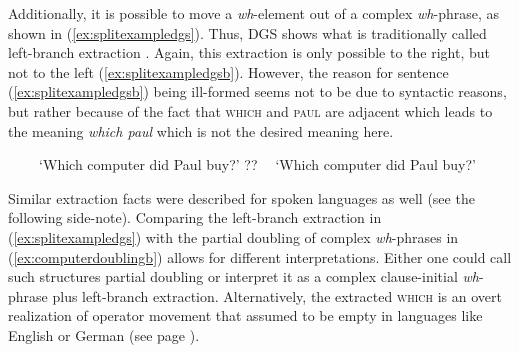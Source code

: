 \noindent Additionally, it is possible to move a \textit{wh}-element out of a complex \textit{wh}-phrase, as shown in (\ref{ex:splitexampledgs}). Thus, DGS shows what is traditionally called left-branch extraction \citep{bovskovic2005left, bovskovic2005locality}. Again, this extraction is only possible to the right, but not to the left (\ref{ex:splitexampledgsb}). However, the reason for sentence (\ref{ex:splitexampledgsb}) being ill-formed seems not to be due to syntactic reasons, but rather because of the fact that \textsc{which} and \textsc{paul} are adjacent which leads to the meaning \textit{which paul} which is not the desired meaning here.%


\begin{exe}
\ex\label{blablablahunderttausend}\begin{xlist}
\ex \textcolor{white}{??}
%
\glt \textcolor{white}{??}`Which computer did Paul buy?' \label{ex:splitexampledgs}
\ex ??
%
\glt \textcolor{white}{??}`Which computer did Paul buy?' \label{ex:splitexampledgsb}
\end{xlist}
\end{exe} 

\noindent Similar extraction facts were described for spoken languages as well (see the following side-note).\label{leftbranchextractiona} Comparing the left-branch extraction in (\ref{ex:splitexampledgs}) with the partial doubling of complex \textit{wh}-phrases in (\ref{ex:computerdoublingb}) allows for different interpretations. Either one could call such structures partial doubling or interpret it as a complex clause-initial \textit{wh}-phrase plus left-branch extraction. Alternatively, the extracted \textsc{which} is an overt realization of operator movement that \citet{van2010complex} assumed to be empty in languages like English or German (see page \pageref{emptyoperator}). 

